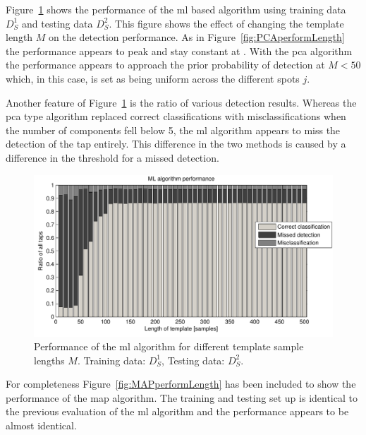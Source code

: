 Figure~\ref{fig:MLperform} shows the performance of the \DIFdelbegin {}\DIFdelend \DIFaddbegin \gls{ml} \DIFaddend based algorithm using training data $D^1_S$ and testing data $D^2_S$. This figure shows the effect of changing the template length $M$ on the detection performance. As in Figure~\ref{fig:PCAperformLength} the performance appears to peak and stay constant at \DIFdelbegin {}\DIFdelend \DIFaddbegin {}\DIFaddend . With the \DIFdelbegin {}\DIFdelend \DIFaddbegin \gls{pca} \DIFaddend algorithm the performance appears to approach the prior probability of detection at $M<50$ which, in this case, is set as being uniform across the different spots $j$.

Another feature of Figure~\ref{fig:MLperform} is the ratio of various detection results. Whereas the \DIFdelbegin {}\DIFdelend \DIFaddbegin \gls{pca} \DIFaddend type algorithm replaced correct classifications with misclassifications when the number of components fell below 5, the \DIFdelbegin {}\DIFdelend \DIFaddbegin \gls{ml} \DIFaddend algorithm appears to miss the detection of the tap entirely. This difference in the two methods is caused by a difference in the threshold for a missed detection.


\begin{figure}[!] %
\centering
\includegraphics[width=150mm]{MLperform.pdf}
\caption{Performance of the \DIFdelbeginFL {}\DIFdelendFL \DIFaddbeginFL \gls{ml} \DIFaddendFL algorithm for different template sample lengths $M$\DIFdelbeginFL {}\DIFdelendFL . Training data: $D^1_S$, Testing data: $D^2_S$.}\label{fig:MLperform}
\end{figure}

For completeness Figure~\ref{fig:MAPperformLength} has been included to show the performance of the \DIFdelbegin {}\DIFdelend \DIFaddbegin \gls{map} \DIFaddend algorithm. The training and testing set up is identical to the previous evaluation of the \DIFdelbegin {}\DIFdelend \DIFaddbegin \gls{ml} \DIFaddend algorithm and the performance appears to be almost identical.

